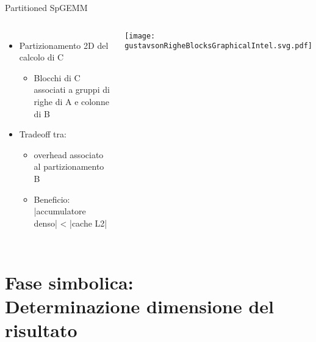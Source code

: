 \begin{frame} {Partitioned SpGEMM}
\begin{columns}
	\begin{itemize}
		\item	Partizionamento 2D del calcolo di C
		\begin{itemize}
			\item	Blocchi di C associati a gruppi di righe di A e colonne di B
		\end{itemize}
		\item	Tradeoff tra:
		\begin{itemize}
			\item	overhead associato al partizionamento B 
			\item	Beneficio: |accumulatore denso| < |cache L2|
		\end{itemize}
	\end{itemize}
	\texttt{[image: gustavsonRigheBlocksGraphicalIntel.svg.pdf]}
\end{columns}
\end{frame}

\section{Fase simbolica:\\Determinazione dimensione del risultato}

